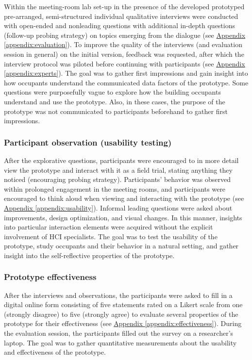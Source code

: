 Within the meeting-room lab set-up in the presence of the developed prototyped pre-arranged, semi-structured individual qualitative interviews were conducted with open-ended and nonleading questions with additional in-depth questions (follow-up probing strategy) on topics emerging from the dialogue (see \hyperref[appendix:evaluation]{Appendix \ref*{appendix:evaluation}}). To improve the quality of the interviews (and evaluation session in general) on the initial version, feedback was requested, after which the interview protocol was piloted before continuing with participants (see \hyperref[appendix:experts]{Appendix \ref*{appendix:experts}}). The goal was to gather first impressions and gain insight into how occupants understand the communicated data factors of the prototype. Some questions were purposefully vague to explore how the building occupants understand and use the prototype. Also, in these cases, the purpose of the prototype was not communicated to participants beforehand to gather first impressions. 

\subsubsection{Participant observation (usability testing)}

After the explorative questions, participants were encouraged to in more detail view the prototype and interact with it as a field trial, stating anything they noticed (encouraging probing strategy). Participants' behavior was observed within prolonged engagement in the meeting rooms, and participants were encouraged to think aloud when viewing and interacting with the prototype (see \hyperref[appendix:usability]{Appendix \ref*{appendix:usability}}). Informal leading questions were asked about improvements, design optimization, and visual changes. In this manner, insights into particular interaction elements were acquired without the explicit involvement of HCI specialists. The goal was to test the usability of the prototype, study occupants and their behavior in a natural setting, and gather insight into the self-reflective properties of the prototype. 

\subsubsection{Prototype effectiveness}

After the interviews and observations, the participants were asked to fill in a digital online form consisting of five statements rated on a Likert scale from one (strongly disagree) to five (strongly agree) to evaluate several properties of the prototype for their effectiveness (see \hyperref[appendix:effectiveness]{Appendix \ref*{appendix:effectiveness}}). During the evaluation session, the participants filled out the survey on a researcher's laptop. The goal was to gather quantitative measurements about the usability and effectiveness of the prototype.

